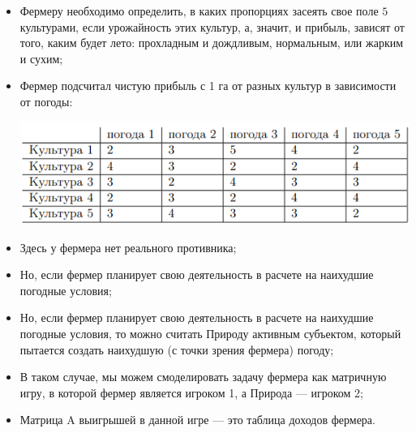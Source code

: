 \documentclass[11pt]{article}
\begin{document}
\begin{itemize}
    \item Фермеру необходимо определить, в каких пропорциях засеять свое поле $5$ культурами, если урожайность этих культур, а, значит, и прибыль, зависят от того, каким будет лето: прохладным и дождливым, нормальным, или жарким и сухим;
    \item Фермер подсчитал чистую прибыль с 1 га от разных культур в зависимости от погоды: 
\begin{center}
        \includegraphics[width=0.75\linewidth]{image_1.png}
        
        
    \end{center}
    \item Здесь у фермера нет реального противника;
    \item Но, если фермер планирует свою деятельность в расчете на наихудшие погодные условия;
    \item Но, если фермер планирует свою деятельность в расчете на наихудшие погодные условия, то можно считать Природу активным субъектом, который пытается создать наихудшую
(с точки зрения фермера) погоду;
    \item В таком случае, мы можем смоделировать задачу фермера как матричную игру, в которой фермер является игроком 1, а Природа — игроком 2;
    \item Матрица A выигрышей в данной игре — это таблица доходов фермера.
\end{itemize}
\end{document}
